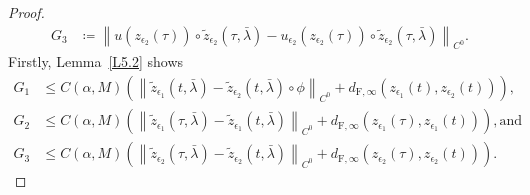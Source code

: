 \documentclass[reqno,centertags,12pt]{amsart}
\theoremstyle{definition}
\numberwithin{equation}{section}
\newcommand{\norm}[1]{\left\|#1\right\|}
\begin{document}
\begin{proof}
\begin{align*}
        G_{3} &\coloneqq
        \norm{u(z_{\epsilon_{2}}(\tau))
        \circ \tilde{z}_{\epsilon_{2}}(\tau,\bar{\lambda})
        - u_{\epsilon_{2}}(z_{\epsilon_{2}}(\tau))
        \circ \tilde{z}_{\epsilon_{2}}(\tau,\bar{\lambda})}_{C^{0}}.
    \end{align*}
    Firstly, Lemma~\ref{L5.2} shows
    \begin{align*}
        G_{1} &\leq C(\alpha,M)\left(
            \norm{\tilde{z}_{\epsilon_{1}}(t,\bar{\lambda})
            - \tilde{z}_{\epsilon_{2}}(t,\bar{\lambda})\circ\phi}_{C^{0}}
            + d_{\mathrm{F},\infty}(z_{\epsilon_{1}}(t), z_{\epsilon_{2}}(t))
        \right), \\
        G_{2} &\leq C(\alpha,M)\left(
            \norm{\tilde{z}_{\epsilon_{1}}(\tau,\bar{\lambda})
            - \tilde{z}_{\epsilon_{1}}(t,\bar{\lambda})}_{C^{0}}
            + d_{\mathrm{F},\infty}(z_{\epsilon_{1}}(\tau), z_{\epsilon_{1}}(t))
        \right), \textrm{and}\\
        G_{3} &\leq C(\alpha,M)\left(
            \norm{\tilde{z}_{\epsilon_{2}}(\tau,\bar{\lambda})
            - \tilde{z}_{\epsilon_{2}}(t,\bar{\lambda})}_{C^{0}}
            + d_{\mathrm{F},\infty}(z_{\epsilon_{2}}(\tau), z_{\epsilon_{2}}(t))
        \right).
    \end{align*}


\end{proof}
\end{document}
